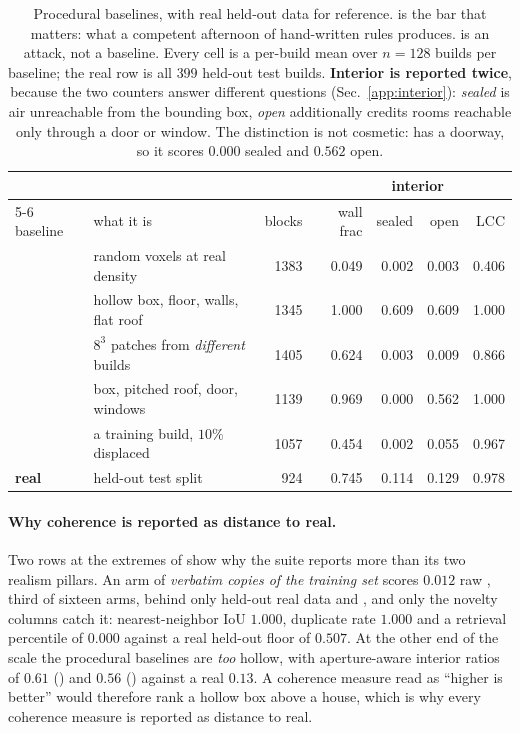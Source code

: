 \begin{table}[t]
\centering
\small
\caption{Procedural baselines, with real held-out data for reference.
\gabled{} is the bar that matters: what a competent afternoon of hand-written
rules produces. \patchstitch{} is an attack, not a baseline. Every cell is a
per-build mean over $n{=}128$ builds per baseline; the real row is all $399$
held-out test builds. \textbf{Interior is reported twice}, because the two
counters answer different questions (Sec.~\ref{app:interior}):
\emph{sealed} is air unreachable from the bounding box, \emph{open} additionally
credits rooms reachable only through a door or window. The distinction is not
cosmetic: \gabled{} has a doorway, so it scores $0.000$ sealed and $0.562$
open.}
\label{tab:baselines}
\setlength{\tabcolsep}{4pt}
\begin{tabular}{llrrrrr}
\toprule
& & & & \multicolumn{2}{c}{interior} & \\
\cmidrule(lr){5-6}
baseline & what it is & blocks & wall frac & sealed & open & LCC \\
\midrule
\randomvox{} & random voxels at real density & 1383 & 0.049 & 0.002 & 0.003 & 0.406 \\
\hollowbox{} & hollow box, floor, walls, flat roof & 1345 & 1.000 & 0.609 & 0.609 & 1.000 \\
\patchstitch{} & $8^3$ patches from \emph{different} builds & 1405 & 0.624 & 0.003 & 0.009 & 0.866 \\
\gabled{} & box, pitched roof, door, windows & 1139 & 0.969 & 0.000 & 0.562 & 1.000 \\
\copynoise{} & a training build, $10\%$ displaced & 1057 & 0.454 & 0.002 & 0.055 & 0.967 \\
\midrule
\textbf{real} & held-out test split & 924 & 0.745 & 0.114 & 0.129 & 0.978 \\
\bottomrule
\end{tabular}
\end{table}

\paragraph{Why coherence is reported as distance to real.} Two rows at the extremes of
 show why the suite reports more than its two realism pillars.
An arm of \emph{verbatim copies of the training set} scores $0.012$ raw \mvkid{}, third of
sixteen arms, behind only held-out real data and \solidify{}, and only the novelty columns
catch it: nearest-neighbor IoU $1.000$, duplicate rate $1.000$ and a retrieval percentile
of $0.000$ against a real held-out floor of $0.507$. At the other end of the scale the
procedural baselines are \emph{too} hollow, with aperture-aware interior ratios of $0.61$
(\hollowbox{}) and $0.56$ (\gabled{}) against a real $0.13$. A coherence measure read as
``higher is better'' would therefore rank a hollow box above a house, which is why every
coherence measure is reported as distance to real.

